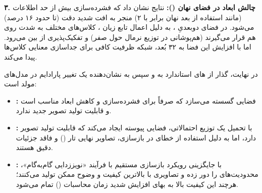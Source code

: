 \documentclass{article}
\begin{document}
\textbf{۳. چالش ابعاد در فضای نهان ():}
نتایج نشان داد که فشرده‌سازی بیش از حد اطلاعات (مانند استفاده از بعد نهان برابر با ۲) منجر به افت شدید دقت (تا حدود ۱۶ درصد) می‌شود. در فضای دوبعدیِ ، به دلیل اعمال تابع زیان ، کلاس‌های مختلف به شدت روی هم قرار می‌گیرند (هم‌پوشانی در توزیع نرمال حول صفر) و تفکیک‌پذیری از بین می‌رود. اما با افزایش این فضا به ۳۲ بُعد، شبکه ظرفیت کافی برای جداسازی معنایی کلاس‌ها پیدا می‌کند.

\begin{tcolorbox}[
	colback=softpink,
	colframe=softred,
	title=نتیجه نهایی و مسیر پیش‌رو,
	fonttitle=\bfseries\Large,
	coltitle=white
	]
	در نهایت، گذار از های استاندارد به \textbf{} و سپس به \textbf{} نشان‌دهنده یک تغییر پارادایم در مدل‌های مولد است:
	\begin{itemize}[label=$\bullet$]
		\item \textbf{:} فضایی گسسته می‌سازد که صرفاً برای فشرده‌سازی و کاهش ابعاد مناسب است و قابلیت تولید تصویر جدید ندارد.
		\item \textbf{:} با تحمیل یک توزیع احتمالاتی، فضایی پیوسته ایجاد می‌کند که قابلیت تولید تصویر دارد، اما به دلیل استفاده از خطای  در بازسازی، تصاویر نهایی تار () و فاقد جزئیات دقیق هستند.
		\item \textbf{:} با جایگزینی رویکرد بازسازی مستقیم با فرآیند «نویززدایی گام‌به‌گام»، محدودیت‌های  را دور زده و تصاویری با بالاترین کیفیت و وضوح ممکن تولید می‌کنند؛ هرچند این کیفیت بالا به بهای افزایش شدید زمان محاسبات () تمام می‌شود.
	\end{itemize}
\end{tcolorbox}
\end{document}
